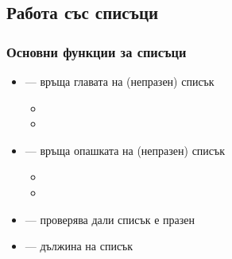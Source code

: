 \documentclass[alsotrans]{beamerswitch}
\begin{document}
\subsection{Работа със списъци}

\begin{frame}
  \frametitle{Основни функции за списъци}

  \begin{itemize}[<+->]
  \item {} --- връща главата на (непразен) списък
    \begin{itemize}
    \item {}
    \item {}
    \end{itemize}
  \item {} --- връща опашката на (непразен) списък
    \begin{itemize}
    \item {}
    \item {}
    \end{itemize}
  \item {} --- проверява дали списък е празен
  \item {} --- дължина на списък
  \end{itemize}
\end{frame}
\end{document}
